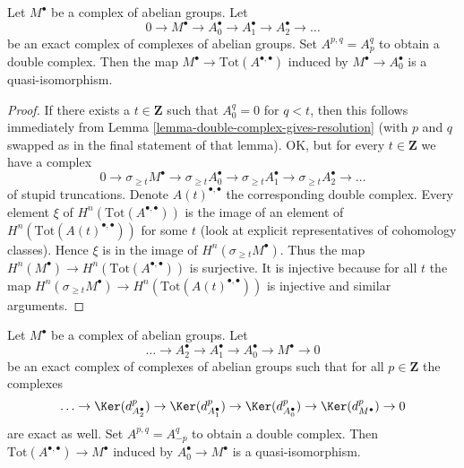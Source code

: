 \begin{lemma}
\label{lemma-right-resolution-gives-qis}
Let $M^\bullet$ be a complex of abelian groups. Let
$$
0 \to M^\bullet \to A_0^\bullet \to A_1^\bullet \to A_2^\bullet \to \ldots
$$
be an exact complex of complexes of abelian groups. Set
$A^{p, q} = A_p^q$ to obtain a double complex.
Then the map $M^\bullet \to \text{Tot}(A^{\bullet, \bullet})$
induced by $M^\bullet \to A_0^\bullet$ is a quasi-isomorphism.
\end{lemma}

\begin{proof}
If there exists a $t \in \mathbf{Z}$ such that $A_0^q = 0$ for $q < t$, then
this follows immediately from
Lemma \ref{lemma-double-complex-gives-resolution}
(with $p$ and $q$ swapped as in the final statement of that lemma).
OK, but for every $t \in \mathbf{Z}$ we have a complex
$$
0 \to
\sigma_{\geq t}M^\bullet \to
\sigma_{\geq t}A_0^\bullet \to
\sigma_{\geq t}A_1^\bullet \to
\sigma_{\geq t}A_2^\bullet \to \ldots
$$
of stupid truncations. Denote $A(t)^{\bullet, \bullet}$ the corresponding
double complex. Every element $\xi$ of $H^n(\text{Tot}(A^{\bullet, \bullet}))$
is the image of an element of $H^n(\text{Tot}(A(t)^{\bullet, \bullet}))$
for some $t$ (look at explicit representatives of cohomology classes).
Hence $\xi$ is in the image of $H^n(\sigma_{\geq t}M^\bullet)$.
Thus the map $H^n(M^\bullet) \to H^n(\text{Tot}(A^{\bullet, \bullet}))$
is surjective. It is injective because for all $t$ the map
$H^n(\sigma_{\geq t}M^\bullet) \to H^n(\text{Tot}(A(t)^{\bullet, \bullet}))$
is injective and similar arguments.
\end{proof}

\begin{lemma}
\label{lemma-good-resolution-gives-qis}
Let $M^\bullet$ be a complex of abelian groups. Let
$$
\ldots \to A_2^\bullet \to A_1^\bullet \to A_0^\bullet \to M^\bullet \to 0
$$
be an exact complex of complexes of abelian groups such that for all
$p \in \mathbf{Z}$ the complexes
$$
\ldots \to \Ker(d_{A_2^\bullet}^p) \to \Ker(d_{A_1^\bullet}^p)
\to \Ker(d_{A_0^\bullet}^p) \to \Ker(d_{M^\bullet}^p) \to 0
$$
are exact as well. Set $A^{p, q} = A_{-p}^q$ to obtain a double
complex. Then $\text{Tot}(A^{\bullet, \bullet}) \to M^\bullet$
induced by $A_0^\bullet \to M^\bullet$ is a quasi-isomorphism.
\end{lemma}

